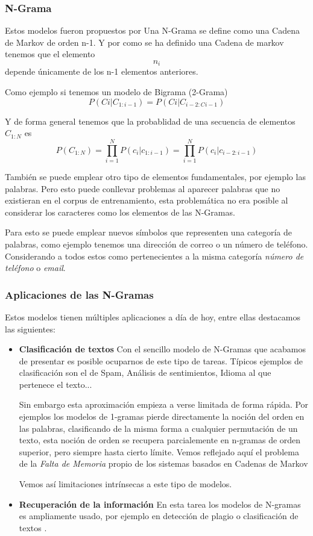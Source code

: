 \subsubsection{N-Grama}

Estos modelos fueron propuestos por \cite{markov1913essay} Una N-Grama se define como una Cadena de Markov de orden n-1. Y por como se ha definido una Cadena de markov tenemos que el elemento \[n_{i}\] depende únicamente de los n-1 elementos anteriores.

Como ejemplo si tenemos un modelo de Bigrama (2-Grama)
\[P(Ci | C_{1:i-1}) = P(Ci | C_{i-2:Ci-1})\]

Y de forma general tenemos que la probablidad de una secuencia de elementos \(C_{1:N}\) es
\[P(C_{1:N}) = \prod_{i=1}^{N}P(c_i | c_{1:i-1}) = \prod_{i=1}^{N} P(c_i | c_{i-2:i-1})\]

También se puede emplear otro tipo de elementos fundamentales, por ejemplo las palabras. Pero esto puede conllevar problemas al aparecer palabras que no existieran en el corpus de entrenamiento, esta problemática no era posible al considerar los caracteres como los elementos de las N-Gramas.

Para esto se puede emplear nuevos símbolos que representen una categoría de palabras, como ejemplo tenemos una dirección de correo o un número de teléfono. Considerando a todos estos como pertenecientes a la misma categoría \textit{número de teléfono} o \textit{email}.

\subsubsection{Aplicaciones de las N-Gramas}

Estos modelos tienen múltiples aplicaciones a día de hoy, entre ellas destacamos las siguientes:

\begin{itemize}
	\item \textbf{Clasificación de textos} Con el sencillo modelo de N-Gramas que acabamos de presentar es posible ocuparnos de este tipo de tareas. Típicos ejemplos de clasificación son el de Spam, Análisis de sentimientos, Idioma al que pertenece el texto...

Sin embargo esta aproximación empieza a verse limitada de forma rápida. Por ejemplos los modelos de 1-gramas pierde directamente la noción del orden en las palabras, clasificando de la misma forma a cualquier permutación de un texto, esta noción de orden se recupera parcialemente en n-gramas de orden superior, pero siempre hasta cierto límite. Vemos reflejado aquí el problema de la \textit{Falta de Memoria} propio de los sistemas basados en Cadenas de Markov

Vemos así limitaciones intrínsecas a este tipo de modelos.

	\item \textbf{Recuperación de la información} En esta tarea los modelos de N-gramas es ampliamente usado, por ejemplo en detección de plagio o clasificación de textos \cite{sood2022creation}.
\end{itemize}

